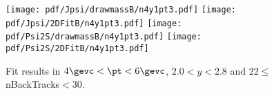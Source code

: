 \begin{figure}[H]
\begin{center}
\texttt{[image: pdf/Jpsi/drawmassB/n4y1pt3.pdf]}
\texttt{[image: pdf/Jpsi/2DFitB/n4y1pt3.pdf]}
\vspace*{-0.5cm}
\texttt{[image: pdf/Psi2S/drawmassB/n4y1pt3.pdf]}
\texttt{[image: pdf/Psi2S/2DFitB/n4y1pt3.pdf]}
\vspace*{-0.5cm}
\end{center}
\caption{Fit results in $4\gevc<\pt<6\gevc$, $2.0<y<2.8$ and 22$\leq$nBackTracks$<$30.}
\label{Fitn4y1pt3}
\end{figure}
